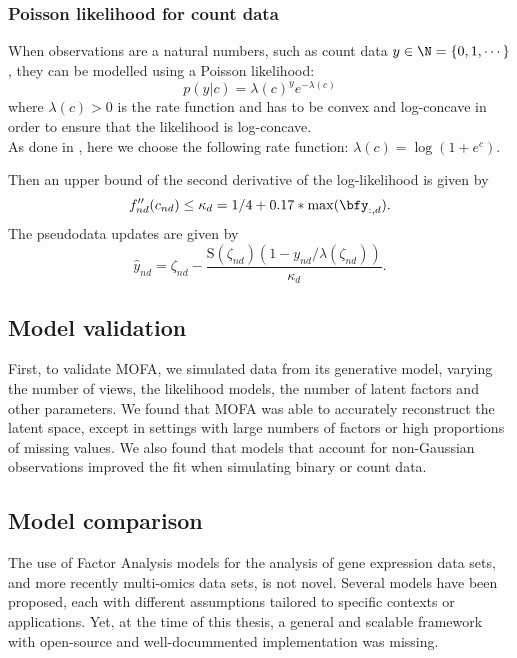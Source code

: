 \subsubsection*{Poisson likelihood for count data}
When observations are a natural numbers, such as count data $y \in \N = \{0,1,\cdots\}$, they can be modelled using a Poisson likelihood:
\begin{equation*}
p(y|c) = \lambda(c)^y e^{-\lambda(c)}
\end{equation*}
where $\lambda(c)>0$ is the rate function and has to be convex and log-concave in order to ensure that the likelihood is log-concave.\\
As done in \cite{seeger}, here we choose the following rate function: $\lambda(c)=\log(1+e^c)$.

Then an upper bound of the second derivative of the log-likelihood is given by
\begin{equation*}
f''_{nd}(c_{nd}) \leq \kappa_d = 1/4 + 0.17*\max(\bfy_{:,d}).
\end{equation*}
The pseudodata updates are given by
\begin{equation*}
\hat{y}_{nd} = \zeta_{nd} - \frac{\mathrm{S}(\zeta_{nd})(1-y_{nd}/\lambda(\zeta_{nd}))}{\kappa_d}.
\end{equation*}


\subsection{Model validation}
First, to validate MOFA, we simulated data from its generative model, varying the number of views, the likelihood models, the number of latent factors and other parameters. We found that MOFA was able to accurately reconstruct the latent space, except in settings with large numbers of factors or high proportions of missing values. We also found that models that account for non-Gaussian observations improved the fit when simulating binary or count data.

\subsection{Model comparison}
The use of Factor Analysis models for the analysis of gene expression data sets, and more recently multi-omics data sets, is not novel. Several models have been proposed, each with different assumptions tailored to specific contexts or applications. Yet, at the time of this thesis, a general and scalable framework with open-source and well-docummented implementation was missing.

